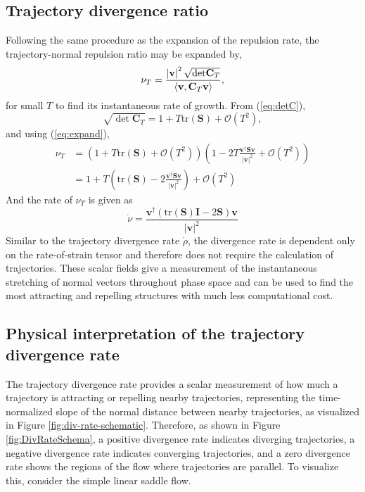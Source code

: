 \documentclass[twocolumn]{svjour3}
\begin{document}
\subsection{Trajectory divergence ratio}
Following the same procedure as the expansion of the repulsion rate, the trajectory-normal repulsion ratio may be expanded by,
\begin{equation}
\nu_T  
= \frac{
\left| \mathbf{v} \right|^2 \sqrt{{\rm det} \mathbf{C}_T  }}{
\langle \mathbf{v} ,\mathbf{C}_T   \mathbf{v}  \rangle
},
\label{eq:nuT}
\end{equation}
for small \(T\) to find its instantaneous rate of growth. From (\ref{eq:detC}),
\begin{equation}
\sqrt{\det \mathbf{C}_T } = 1 + T\text{tr}(\mathbf{S} )+\mathcal{O}(T^2),
\end{equation}
and using (\ref{eq:expand}),
\begin{equation}
\begin{aligned}
\nu_T  & = \left(1 + T\text{tr}(\mathbf{S} )+\mathcal{O}(T^2)\right)\left(1-2T \frac{\mathbf{v} ^\dagger \mathbf{S} \mathbf{v} }{\left|\mathbf{v} \right|^2}+\mathcal{O}(T^2)\right) \\
& = 1 + T\left(\text{tr}(\mathbf{S} )-2\frac{\mathbf{v} ^\dagger \mathbf{S} \mathbf{v} }{\left|\mathbf{v} \right|^2}\right)+\mathcal{O}(T^2)
\end{aligned}
\end{equation}
And the rate of \(\nu_T\) is given as 
\begin{equation}
\dot{\nu} = \frac{\mathbf{v}^\dagger\left(\text{tr}(\mathbf{S})\mathbf{I}-2 \mathbf{S}\right)\mathbf{v}}{\left|\mathbf{v}\right|^2}
\end{equation}
Similar to the trajectory divergence rate $\dot{\rho}$, the divergence rate is dependent only on the rate-of-strain tensor and therefore does not require the calculation of trajectories. These scalar fields give a measurement of the instantaneous stretching of normal vectors throughout phase space and can be used to find the most attracting and repelling structures with much less computational cost.

\subsection{Physical interpretation of the trajectory divergence rate}
The trajectory divergence rate provides a scalar measurement of how much a trajectory is attracting or repelling nearby trajectories, representing the time-normalized slope of the normal distance between nearby trajectories, as visualized in Figure \ref{fig:div-rate-schematic}. Therefore, as shown in Figure \ref{fig:DivRateSchema}, a positive divergence rate indicates diverging trajectories, a negative divergence rate indicates converging trajectories, and a zero divergence rate shows the regions of the flow where trajectories are parallel.	To visualize this, consider the simple linear saddle flow.
\end{document}
